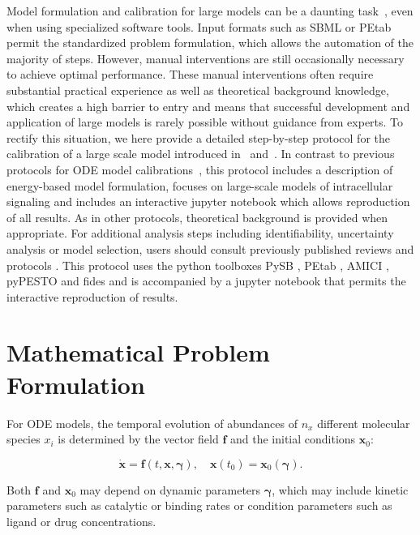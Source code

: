 \documentclass[11pt]{article}
\newcommand{\dims}[1]{{n_{#1}}}
\begin{document}
    Model formulation and calibration for large models can be a daunting
task~\cite{2754712/C7C8DJNE}, even when using specialized software
tools. Input formats such as SBML or PEtab~\cite{2754712/86CV69R2}
permit the standardized problem formulation, which allows the automation
of the majority of steps. However, manual interventions are still
occasionally necessary to achieve optimal performance. These manual
interventions often require substantial practical experience as well as
theoretical background knowledge, which creates a high barrier to entry
and means that successful development and application of large models is
rarely possible without guidance from experts. To rectify this
situation, we here provide a detailed step-by-step protocol for the
calibration of a large scale model introduced in~\cite{2754712/I4JQ4DMV}
and~\cite{2754712/Y3E9IYH8}. In contrast to previous protocols for ODE
model calibrations~\cite{2754712/3DK88XY2}, this protocol includes a
description of energy-based model formulation, focuses on large-scale
models of intracellular signaling and includes an interactive jupyter
notebook which allows reproduction of all results. As in other
protocols, theoretical background is provided when appropriate. For
additional analysis steps including identifiability, uncertainty
analysis or model selection, users should consult previously published
reviews and protocols . This protocol uses the python toolboxes PySB ,
PEtab , AMICI , pyPESTO and fides and is accompanied by a jupyter
notebook that permits the interactive reproduction of results.

    \hypertarget{mathematical-problem-formulation}{%
\section{Mathematical Problem
Formulation}\label{mathematical-problem-formulation}}

For ODE models, the temporal
evolution of abundances of \(\dims{x}\) different molecular species
\(x_i\) is determined by the vector field \(\textbf{f}\) and the initial
conditions \(\textbf{x}_0\):

\begin{equation}
\dot{\textbf{x}}=\textbf{f}(t,\textbf{x},\boldsymbol{\gamma}),\quad \textbf{x}(t_0) = \textbf{x}_0(\boldsymbol{\gamma}).
\label{eq:ode}
\end{equation}

Both \(\textbf{f}\) and \(\textbf{x}_0\) may depend on dynamic
parameters \(\boldsymbol{\gamma}\), which may include kinetic parameters
such as catalytic or binding rates or condition parameters such as
ligand or drug concentrations.
\end{document}
